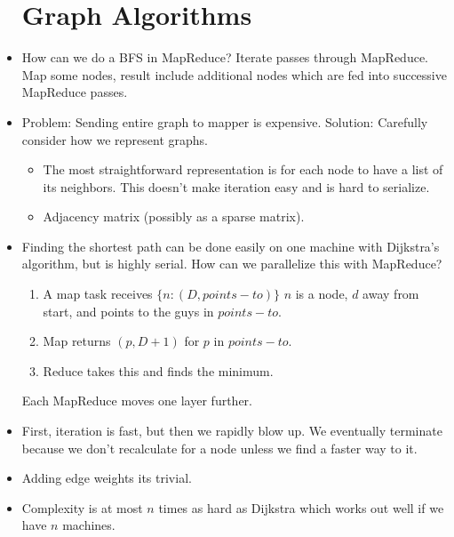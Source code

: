 \documentclass{scrartcl}
\begin{document}
\begin{itemize}
\section*{Graph Algorithms}
\item How can we do a BFS in MapReduce? Iterate passes through MapReduce. Map
	some nodes, result include additional nodes which are fed into successive
	MapReduce passes.
\item Problem: Sending entire graph to mapper is expensive. Solution: Carefully
	consider how we represent graphs.
	\begin{itemize}
	\item The most straightforward representation is for each node to have a list of
		its neighbors. This doesn't make iteration easy and is hard to serialize.
	\item Adjacency matrix (possibly as a sparse matrix).
	\end{itemize}
\item Finding the shortest path can be done easily on one machine with Dijkstra's
	algorithm, but is highly serial. How can we parallelize this with MapReduce?
	\begin{enumerate}
	\item A map task receives $\{n : (D, points-to)\}$ $n$ is a node, $d$ away from
		start, and points to the guys in $points-to$.
	\item Map returns $(p, D+1)$ for $p$ in $points-to$.
	\item Reduce takes this and finds the minimum.
	\end{enumerate}
	Each MapReduce moves one layer further.
\item First, iteration is fast, but then we rapidly blow up. We eventually
	terminate because we don't recalculate for a node unless we find
	a faster way to it.
\item Adding edge weights its trivial.
\item Complexity is at most $n$ times as hard as Dijkstra which works out
	well if we have $n$ machines.

\end{itemize}
\end{document}
